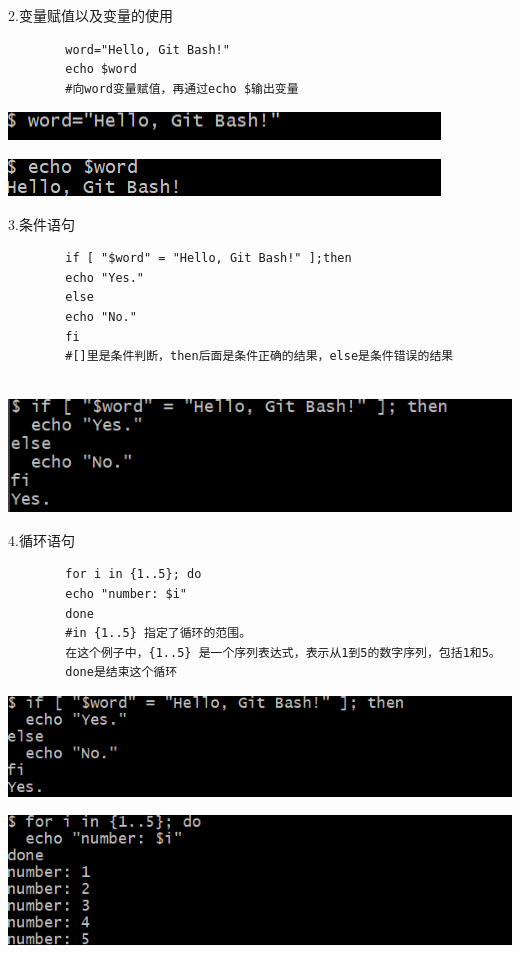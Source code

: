 \documentclass{article}
\begin{document}
	
	2.变量赋值以及变量的使用
	\begin{verbatim}
		word="Hello, Git Bash!"
		echo $word
		#向word变量赋值，再通过echo $输出变量
	\end{verbatim}
	
	
	\noindent
	\begin{minipage}{\linewidth}
		\centering
		\includegraphics[width=0.5\linewidth]{example2.1.png}
	\end{minipage}
	\noindent
	\begin{minipage}{\linewidth}
		\centering
		\includegraphics[width=0.5\linewidth]{example2.2.png}
		\label{fig:example}
	\end{minipage}
	
	
	3.条件语句
	\begin{verbatim}
		if [ "$word" = "Hello, Git Bash!" ];then
		echo "Yes."
		else
		echo "No."
		fi
		#[]里是条件判断，then后面是条件正确的结果，else是条件错误的结果
		
	\end{verbatim}
	
	\noindent
	\begin{minipage}{\linewidth}
		\centering
		\includegraphics[width=0.5\linewidth]{example3.png}
		\label{fig:example}
	\end{minipage}
	
	4.循环语句
	\begin{verbatim}
		for i in {1..5}; do
		echo "number: $i"
		done
		#in {1..5} 指定了循环的范围。
		在这个例子中，{1..5} 是一个序列表达式，表示从1到5的数字序列，包括1和5。
		done是结束这个循环
	\end{verbatim}
	
	\noindent
	\begin{minipage}{\linewidth}
		\centering
		\includegraphics[width=0.5\linewidth]{example4.1.png}
	\end{minipage}
	\noindent
	\begin{minipage}{\linewidth}
		\centering
		\includegraphics[width=0.5\linewidth]{example4.2.png}
		\label{fig:example}
	\end{minipage}
	
\end{document}
